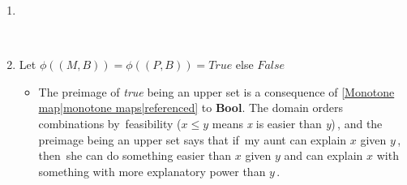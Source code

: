\begin{enumerate}
    \item  \,\,
    \item  Let $\phi((M,B))=\phi((P,B))=True$ else $False$
          \begin{itemize}
            \item The preimage of \emph{true} being an upper set is a consequence of \ref{Monotone map|monotone maps|referenced} to \textbf{Bool}. The domain orders combinations by \,feasibility ($x\leq y$ means \emph{x} is easier than \emph{y})\,, and the preimage being an upper set says that if \,my aunt can explain $x$ given $y$\,, then \,she can do something easier than $x$ given $y$ and can explain $x$ with something with more explanatory power than $y$\,.
          \end{itemize}
  \end{enumerate}
